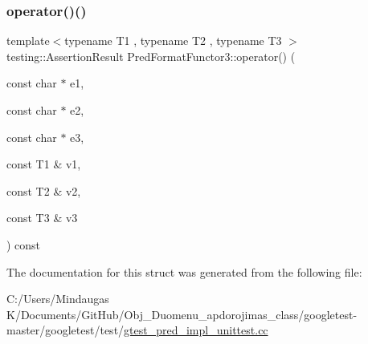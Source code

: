 \mbox{\label{struct_pred_format_functor3_a35575b0ed1e572d3a31603b07a3f6b30}} 
\subsubsection{\texorpdfstring{operator()()}{operator()()}\hspace{0.1cm}{\footnotesize\ttfamily [3/3]}}
{\footnotesize\ttfamily template$<$typename T1 , typename T2 , typename T3 $>$ \\
testing\+::\+Assertion\+Result Pred\+Format\+Functor3\+::operator() (\begin{DoxyParamCaption}\item[{const char $\ast$}]{e1,  }\item[{const char $\ast$}]{e2,  }\item[{const char $\ast$}]{e3,  }\item[{const T1 \&}]{v1,  }\item[{const T2 \&}]{v2,  }\item[{const T3 \&}]{v3 }\end{DoxyParamCaption}) const\hspace{0.3cm}{\ttfamily [inline]}}



The documentation for this struct was generated from the following file\+:\begin{DoxyCompactItemize}
\item 
C\+:/\+Users/\+Mindaugas K/\+Documents/\+Git\+Hub/\+Obj\+\_\+\+Duomenu\+\_\+apdorojimas\+\_\+class/googletest-\/master/googletest/test/\mbox{\hyperlink{googletest-master_2googletest_2test_2gtest__pred__impl__unittest_8cc}{gtest\+\_\+pred\+\_\+impl\+\_\+unittest.\+cc}}\end{DoxyCompactItemize}
